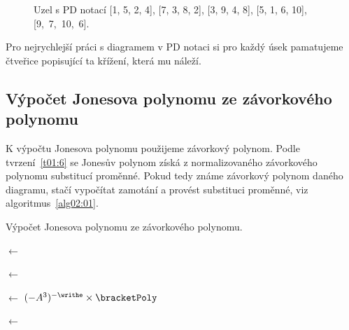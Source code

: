 \begin{figure}[h]
\centering 
{}
\caption{Uzel s PD notací [1, 5, 2, 4], [7, 3, 8, 2], [3, 9, 4, 8], [5, 1, 6, 10], [9,~7,~10,~6].} \label{pd}
\end{figure}

Pro nejrychlejší práci s diagramem v PD notaci si pro každý úsek pamatujeme čtveřice popisující ta křížení, která mu náleží.

\subsection{Výpočet Jonesova polynomu ze závorkového polynomu} \label{jones}

K výpočtu Jonesova polynomu použijeme závorkový polynom. Podle tvrzení~\ref{t01:6} se Jonesův polynom získá z normalizovaného závorkového polynomu substitucí proměnné. Pokud tedy známe závorkový polynom daného diagramu, stačí vypočítat zamotání a provést substituci proměnné,  viz algoritmus~\ref{alg02:01}.

\begin{algorithm}[t]

\caption{  Výpočet Jonesova polynomu ze závorkového polynomu.} 
{\label{alg02:01}}

\DontPrintSemicolon
{}



\BlankLine

\bracketPoly $\leftarrow$ \Bracket{\D}

\writhe $\leftarrow$ \Writhe{\D}

\normal $\leftarrow$ $ (-A^3)^{-\writhe} \times \bracketPoly$

\jones $\leftarrow$ 

\BlankLine

\KwRet \jones 



\end{algorithm}


